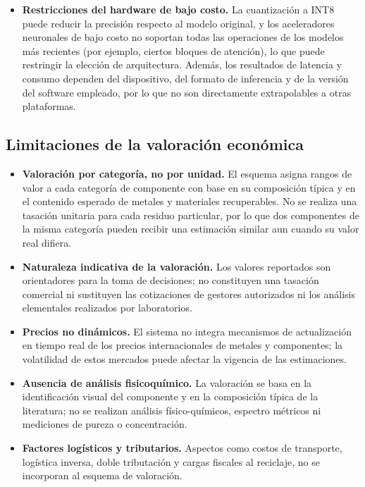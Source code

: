 \begin{itemize}
    \item \textbf{Restricciones del hardware de bajo costo.} La cuantización a INT8 puede reducir la precisión respecto al modelo original, y los aceleradores neuronales de bajo costo no soportan todas las operaciones de los modelos más recientes (por ejemplo, ciertos bloques de atención), lo que puede restringir la elección de arquitectura. Además, los resultados de latencia y consumo dependen del dispositivo, del formato de inferencia y de la versión del software empleado, por lo que no son directamente extrapolables a otras plataformas.
\end{itemize}

\subsection{Limitaciones de la valoración económica}
\begin{itemize}
    \item \textbf{Valoración por categoría, no por unidad.} El esquema asigna rangos de valor a cada categoría de componente con base en su composición típica y en el contenido esperado de metales y materiales recuperables. No se realiza una tasación unitaria para cada residuo particular, por lo que dos componentes de la misma categoría pueden recibir una estimación similar aun cuando su valor real difiera.
    \item \textbf{Naturaleza indicativa de la valoración.} Los valores reportados son orientadores para la toma de decisiones; no constituyen una tasación comercial ni sustituyen las cotizaciones de gestores autorizados ni los análisis elementales realizados por laboratorios.
    \item \textbf{Precios no dinámicos.} El sistema no integra mecanismos de actualización en tiempo real de los precios internacionales de metales y componentes; la volatilidad de estos mercados puede afectar la vigencia de las estimaciones.
    \item \textbf{Ausencia de análisis fisicoquímico.} La valoración se basa en la identificación visual del componente y en la composición típica de la literatura; no se realizan análisis físico-químicos, espectro métricos ni mediciones de pureza o concentración.
    \item \textbf{Factores logísticos y tributarios.} Aspectos como costos de transporte, logística inversa, doble tributación y cargas fiscales al reciclaje, no se incorporan al esquema de valoración.
\end{itemize}

